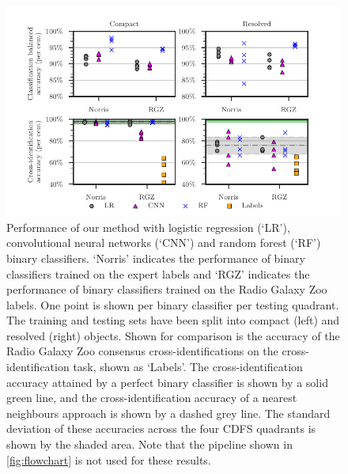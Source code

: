     \begin{figure}
    \centering
    \includegraphics[width=1.0\linewidth]{atlas-images/cdfs-grid-new.pdf}
    \caption[Performance of our method with different binary classifiers on the binary classification task.]{Performance of our method with logistic regression (`LR'), convolutional neural networks (`CNN') and random forest (`RF') binary classifiers. `Norris' indicates the performance of binary classifiers trained on the expert labels and `RGZ' indicates the performance of binary classifiers trained on the Radio Galaxy Zoo labels. One point is shown per binary classifier per testing quadrant. The training and testing sets have been split into compact (left) and resolved (right) objects. {Shown for comparison is the accuracy of the Radio Galaxy Zoo consensus cross-identifications on the cross-identification task, shown as `Labels'.} The cross-identification accuracy attained by a perfect binary classifier is shown by a solid green line, and the cross-identification accuracy of a nearest neighbours approach is shown by a dashed grey line. The standard deviation of these accuracies across the four CDFS quadrants is shown by the shaded area. Note that the pipeline shown in \autoref{fig:flowchart} is not used for these results. \label{fig:ba}}
    \end{figure}

